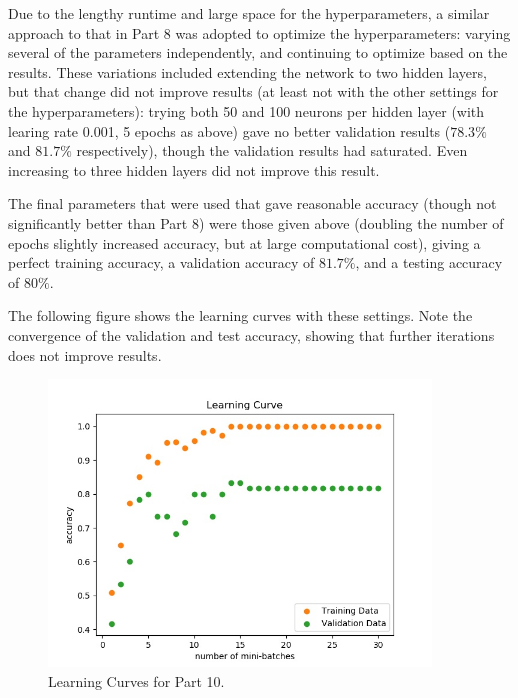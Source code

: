 \documentclass{article}
\begin{document}
   Due to the lengthy runtime and large space for the hyperparameters, a similar approach
   to that in Part 8 was adopted to optimize the hyperparameters: varying several of the parameters
   independently, and continuing to optimize based on the results.
   These variations included extending the network to two hidden layers, but that change did not
   improve results (at least not with the other settings for the hyperparameters):
   trying both 50 and 100 neurons per hidden layer (with learing rate 0.001, 5 epochs as above)
   gave no better validation results ($78.3\%$ and $81.7\%$ respectively), though the validation
   results had saturated. Even increasing to three hidden layers did not improve this result.

   The final parameters that were used that gave reasonable accuracy (though not significantly better
   than Part 8) were those given above (doubling the number of epochs slightly increased accuracy, but at
   large computational cost), giving a perfect training accuracy, a validation
   accuracy of $81.7\%$, and a testing accuracy of $80\%$.

   The following figure shows the learning curves with these settings. Note the convergence of
   the validation and test accuracy, showing that further iterations does not improve results.

      \begin{figure}[h!] \centering
         \includegraphics[width=4in]{resources/part10}
         \caption{Learning Curves for Part 10.}
         \label{part10}
       \end{figure}
\end{document}

